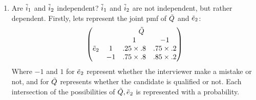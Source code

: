 \documentclass[12pt,twoside]{article}
\begin{document}
\begin{enumerate}
\begin{enumerate}
\item Are $\Tilde{i}_1$ and $\Tilde{i}_2$ independent? 
\subitem
$\Tilde{i}_1$ and $\Tilde{i}_2$ are not independent, but rather dependent.
Firstly, lets represent the joint pmf of $\Tilde{Q}$ and $\Tilde{e}_2$:
$$
    \begin{pmatrix}
    \ & \ &  \qquad \Tilde{Q} & \ \\
    \ & \ & 1 & -1 \\
    \Tilde{e}_2 & 1 & .25 \times .8 & .75 \times .2 \\
    \ & -1 & .75 \times .8 & .85 \times .2
    \end{pmatrix}
$$
Where $-1$ and $1$ for $\Tilde{e}_2$ represent whether the interviewer make a mistake or not, and for $\Tilde{Q}$ represents whether the candidate is qualified or not. Each intersection of the possibilities of $\Tilde{Q}, \Tilde{e}_2$ is represented with a probability. 


\end{enumerate}
\end{enumerate}
\end{document}
